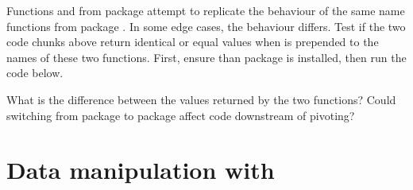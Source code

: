 \documentclass[krantz2]{krantz}\usepackage{knitr}
\begin{document}
%
\begin{advplayground}
  Functions  and  from package  attempt to replicate the behaviour of the same name functions from package . In some edge cases, the behaviour differs. Test if the two code chunks above return identical or equal values when   is prepended to the names of these two functions. First, ensure than package  is installed, then run the code below.

\begin{knitrout}\footnotesize
{}\color{fgcolor}\begin{kframe}
\begin{alltt}
 \hlkwb{<-}
  \hlopt{::}\hlstd{(}
     \hlstd{=} \hlopt{-}
     \hlstd{=} \hlstd{,}
     \hlstd{=} \hlstd{)}
\end{alltt}
\end{kframe}
\end{knitrout}

What is the difference between the values returned by the two functions? Could switching from package  to package  affect code downstream of pivoting?
\end{advplayground}

\section{Data manipulation with }
\end{document}
